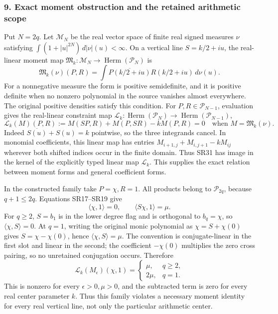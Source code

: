 \subsubsection{9. Exact moment obstruction and the retained arithmetic scope}\label{endpoint-four_window_sharpness_review--exact-moment-obstruction-and-the-retained-arithmetic-scope}

Put \(N=2q\). Let \(\mathcal M_N\) be the real vector space of finite real signed measures \(\nu\) satisfying \(\int(1+|u|^{2N})\,d|\nu|(u)<\infty\). On a vertical line \(S=k/2+iu\), the real-linear moment map \(\mathfrak M_k:\mathcal M_N\to\operatorname{Herm}(\mathcal P_N)\) is \[
\mathfrak M_k(\nu)(P,R)
=\int\overline{P(k/2+iu)}R(k/2+iu)\,d\nu(u).
\tag{SR31}
\] For a nonnegative measure the form is positive semidefinite, and it is positive definite when no nonzero polynomial in the source vanishes almost everywhere. The original positive densities satisfy this condition. For \(P,R\in\mathcal P_{N-1}\), evaluation gives the real-linear constraint map \(\mathcal L_k:\operatorname{Herm}(\mathcal P_N)\to\operatorname{Herm}(\mathcal P_{N-1})\), \[
\mathcal L_k(M)(P,R)
:=M(SP,R)+M(P,SR)-kM(P,R)=0
\quad\text{when }M=\mathfrak M_k(\nu).
\tag{SR32}
\] Indeed \(\overline{S(u)}+S(u)=k\) pointwise, so the three integrands cancel. In monomial coefficients, this linear map has entries \(M_{i+1,j}+M_{i,j+1}-kM_{ij}\) wherever both shifted indices occur in the finite domain. Thus SR31 has image in the kernel of the explicitly typed linear map \(\mathcal L_k\). This supplies the exact relation between moment forms and general coefficient forms.

In the constructed family take \(P=\chi,R=1\). All products belong to \(\mathcal P_{2q}\), because \(q+1\le2q\). Equations SR17--SR19 give \[
\langle\chi,1\rangle=0,\qquad
\langle S\chi,1\rangle=\mu.
\tag{SR33}
\] For \(q\ge2\), \(S=b_1\) is in the lower degree flag and is orthogonal to \(b_q=\chi\), so \(\langle\chi,S\rangle=0\). At \(q=1\), writing the original monic polynomial as \(\chi=S+\chi(0)\) gives \(S=\chi-\chi(0)\), hence \(\langle\chi,S\rangle=\mu\). The convention is conjugate-linear in the first slot and linear in the second; the coefficient \(-\chi(0)\) multiplies the zero cross pairing, so no unretained conjugation occurs. Therefore \[
\mathcal L_k(M_\epsilon)(\chi,1)
=\begin{cases}\mu,&q\ge2,\\2\mu,&q=1.\end{cases}
\tag{SR34}
\] This is nonzero for every \(\epsilon>0,\mu>0\), and the subtracted term is zero for every real center parameter \(k\). Thus this family violates a necessary moment identity for every real vertical line, not only the particular arithmetic center.

